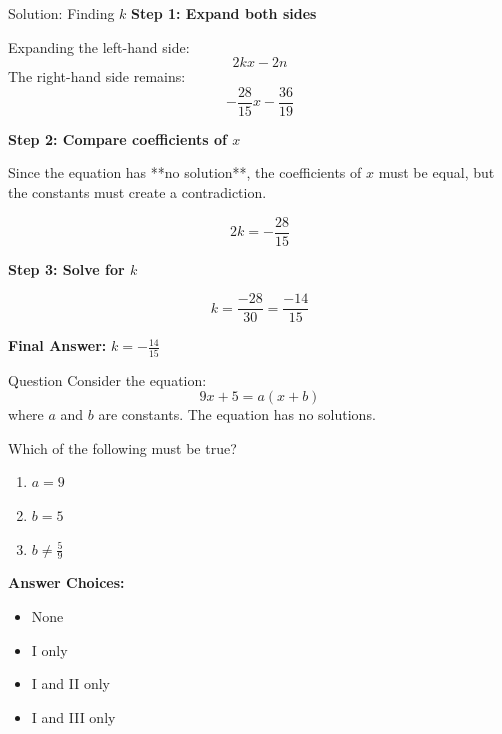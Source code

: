 \documentclass{beamer}
\begin{document}
\begin{frame}{Solution: Finding \( k \)}
    \textbf{Step 1: Expand both sides}
    
    Expanding the left-hand side:
    \[
    2kx - 2n
    \]
    The right-hand side remains:
    \[
    -\frac{28}{15} x - \frac{36}{19}
    \]

    \vspace{0.3cm}

    \textbf{Step 2: Compare coefficients of \( x \)}
    
    Since the equation has **no solution**, the coefficients of \( x \) must be equal, but the constants must create a contradiction.

    \[
    2k = -\frac{28}{15}
    \]

    
    \textbf{Step 3: Solve for \( k \)}
    
    \[
    k = \frac{-28}{30} = \frac{-14}{15}
    \]

    \textbf{Final Answer:} \textcolor{novelPurple}{\textbf{\( k = -\frac{14}{15} \)}}
\end{frame}


\begin{frame}{Question}
    Consider the equation:
    \[
    9x + 5 = a(x + b)
    \]
    where \( a \) and \( b \) are constants. The equation has no solutions.

    \vspace{0.5cm}
    Which of the following must be true?
    
    \begin{enumerate}
        \item \( a = 9 \)
        \item \( b = 5 \)
        \item \( b \neq \frac{5}{9} \)
    \end{enumerate}

    \vspace{0.5cm}
    \textbf{Answer Choices:}
    
    \begin{itemize}
        \item[A.] None
        \item[B.] I only
        \item[C.] I and II only
        \item[D.] I and III only
    \end{itemize}
\end{frame}
\end{document}
